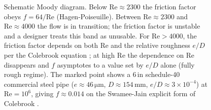 \begin{figure}[htbp]
\caption[Moody diagram, schematic]{Schematic Moody diagram. Below
$\mathrm{Re} \approx 2300$ the friction factor obeys
$f = 64/\mathrm{Re}$ (Hagen-Poiseuille). Between $\mathrm{Re}
\approx 2300$ and $\mathrm{Re} \approx 4000$ the flow is in
transition; the friction factor is unstable and a designer treats
this band as unusable. For $\mathrm{Re} > 4000$, the friction factor
depends on both $\mathrm{Re}$ and the relative roughness $e/D$ per
the Colebrook equation \cite{paper:colebrook-1939}; at high
$\mathrm{Re}$ the dependence on $\mathrm{Re}$ disappears and $f$
asymptotes to a value set by $e/D$ alone (fully rough regime). The
marked point shows a $6\,\text{in}$ schedule-40 commercial steel
pipe ($e \approx 46\,\si{\micro\meter}$, $D \approx 154\,\si{\milli
\meter}$, $e/D \approx 3 \times 10^{-4}$) at $\mathrm{Re} = 10^{6}$,
giving $f \approx 0.014$ on the Swamee-Jain explicit form of
Colebrook \cite{paper:swamee-jain-1976}.}
\label{fig:vol01:ch02:moody}
\end{figure}
